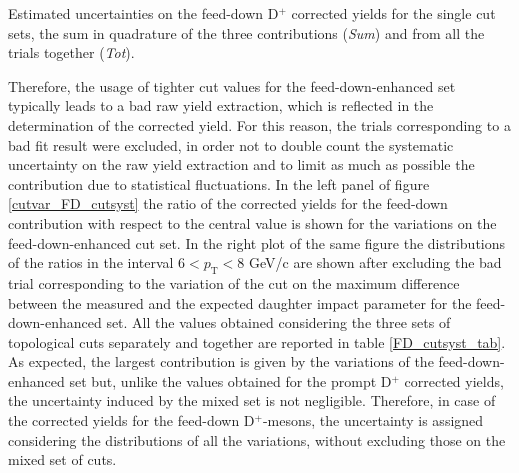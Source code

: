 \documentclass[b5paper,10pt,twoside,oldstyle,classica]{toptesi}
\newcommand{\pt}{p_\text{T}}
\begin{document}
\begin{table}[b]
\begin{center}
\caption{Estimated uncertainties on the feed-down D$^+$ corrected yields for the single cut sets, the sum in quadrature of the three contributions (\textit{Sum}) and from all the trials together (\textit{Tot}).}
\label{FD_cutsyst_tab}
\end{center} 
\end{table} Therefore, the usage of tighter cut values for the feed-down-enhanced set typically leads to a bad raw yield extraction, which is reflected in the determination of the corrected yield. For this reason, the trials corresponding to a bad fit result were excluded, in order not to double count the systematic uncertainty on the raw yield extraction and to limit as much as possible the contribution due to statistical fluctuations. In the left panel of figure \ref{cutvar_FD_cutsyst} the ratio of the corrected yields for the feed-down contribution with respect to the central value is shown for the variations on the feed-down-enhanced cut set. In the right plot of the same figure the distributions of the ratios in the interval $6<\pt<8$ GeV/c are shown after excluding the bad trial corresponding to the variation of the cut on the maximum difference between the measured and the expected daughter impact parameter for the feed-down-enhanced set. All the values obtained considering the three sets of topological cuts separately and together are reported in table \ref{FD_cutsyst_tab}. As expected, the largest contribution is given by the variations of the feed-down-enhanced set but, unlike the values obtained for the prompt D$^+$ corrected yields, the uncertainty induced by the mixed set is not negligible. Therefore, in case of the corrected yields for the feed-down D$^+$-mesons, the uncertainty is assigned considering the distributions of all the variations, without excluding those on the mixed set of cuts.  
\end{document}
